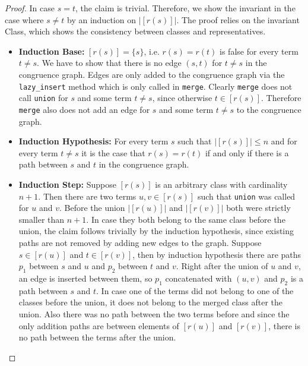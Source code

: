 \begin{proof}

In case $s = t$, the claim is trivial.
Therefore, we show the invariant in the case where $s \neq t$ by an induction on $|[r(s)]|$.
The proof relies on the invariant Class, which shows the consistency between classes and representatives.

\begin{itemize}
\item \textbf{Induction Base:} $[r(s)] = \{s\}$, i.e. $r(s) = r(t)$ is false for every term $t \neq s$.
We have to show that there is no edge $(s,t)$ for $t \neq s$ in the congruence graph.
Edges are only added to the congruence graph via the \texttt{lazy\_insert} method which is only called in \texttt{merge}.
Clearly \texttt{merge} does not call \texttt{union} for $s$ and some term $t \neq s$, since otherwise $t \in [r(s)]$.
Therefore \texttt{merge} also does not add an edge for $s$ and some term $t \neq s$ to the congruence graph.

\item \textbf{Induction Hypothesis:} For every term $s$ such that $|[r(s)]| \leq n$ and for every term $t \neq s$ it is the case that $r(s) = r(t)$ if and only if there is a path between $s$ and $t$ in the congruence graph.

\item \textbf{Induction Step:} Suppose $[r(s)]$ is an arbitrary class with cardinality $n+1$.
Then there are two terms $u,v \in [r(s)]$ such that \texttt{union} was called for $u$ and $v$.
Before the union $|[r(u)]|$ and $|[r(v)]|$ both were strictly smaller than $n+1$.
In case they both belong to the same class before the union, the claim follows trivially by the induction hypothesis, since existing paths are not removed by adding new edges to the graph.
Suppose $s \in [r(u)]$ and $t \in [r(v)]$, then by induction hypothesis there are paths $p_1$ between $s$ and $u$ and $p_2$ between $t$ and $v$.
Right after the union of $u$ and $v$, an edge is inserted between them, so $p_1$ concatenated with $(u,v)$ and $p_2$ is a path between $s$ and $t$.
In case one of the terms did not belong to one of the classes before the union, it does not belong to the merged class after the union.
Also there was no path between the two terms before and since the only addition paths are between elements of $[r(u)]$ and $[r(v)]$, there is no path between the terms after the union.
\end{itemize}

\end{proof}

